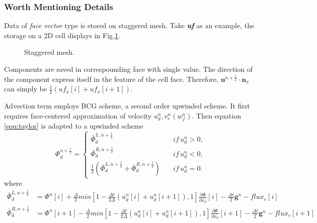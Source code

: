 \documentclass[a4paper]{article}
\newcommand{\para}[1]{\textbf{\emph{\textcolor{para}{#1}}}}
\begin{document}
\subsubsection{Worth Mentioning Details}\label{sec:tracerdetail}
Data of \emph{face vector} type is stored on staggered mesh\cite{harlow1965numerical}. Take \para{uf} as an example, the storage on a 2D cell displays in Fig.\ref{fig:staggered}.
\begin{figure}[H]
     \centering
     \begin{center}
     \end{center}
     \caption{Staggered mesh.}
     \label{fig:staggered}
\end{figure}
Components are saved in correspounding face with single value. The direction of the component express itself in the feature of the cell face. Therefore, $ \mathbf{u}^{n + \frac{1}{2}} \cdot \mathbf{n}_x$ can simply be $ \frac{1}{2}(uf_x[i]+uf_x[i+1])$.\par
Advection term employs BCG scheme\cite{martin2000cell}, a second order upwinded scheme. It first requires face-centered approximation of velocity $u_d^n,v_e^n(w_f^n)$. Then equation \ref{equ:taylor} is adapted to a upwinded scheme
\begin{equation}
  \Phi_d^{n+ \frac{1}{2}}=
    \left \{ 
    \begin{array}{cc}
      \bar{\Phi}^{L,n+ \frac{1}{2}}_d\quad &if\, u_d^n>0,\\
      \bar{\Phi}^{R,n+ \frac{1}{2}}_d\quad &if\, u_d^n<0,\\
      \frac{1}{2}(\bar{\Phi}^{L,n+ \frac{1}{2}}_d+\bar{\Phi}^{R,n+ \frac{1}{2}}_d)\quad &if \,u_d^n=0.
    \end{array}
    \right.
\end{equation}
where
\begin{align}
  \bar{\Phi}^{L,n+ \frac{1}{2}}_d &= \Phi^n[i] + \frac{\Delta}{2}min[1- \frac{\Delta t}{2\Delta}(u_d^n[i]+u_d^n[i+1]),1] \frac{\partial \Phi}{\partial x_d}[i]- \frac{\Delta t}{2} \mathbf{g}^n-flux_e[i]\\
  \bar{\Phi}^{R,n+ \frac{1}{2}}_d &= \Phi^n[i+1] - \frac{\Delta}{2}min[1- \frac{\Delta t}{2\Delta}(u_d^n[i]+u_d^n[i+1]),1]\frac{\partial \Phi}{\partial x_d}[i+1]- \frac{\Delta t}{2} \mathbf{g}^n-flux_e[i+1]
\end{align}
\end{document}
